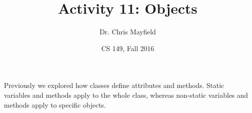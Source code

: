 \documentclass[12pt]{article}
\title{Activity 11: Objects}
\author{Dr. Chris Mayfield}
\date{CS 149, Fall 2016}
\begin{document}
\maketitle

Previously we explored how classes define attributes and methods.
Static variables and methods apply to the whole class, whereas non-static variables and methods apply to specific objects.



\end{document}
